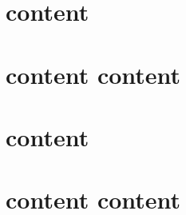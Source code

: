 \documentclass[11pt]{article}
\begin{document}
    \section{   content }
    
    \section{   content   content }
    
    \section{   content }
    
    \section{   content   content }
    
\end{document}
